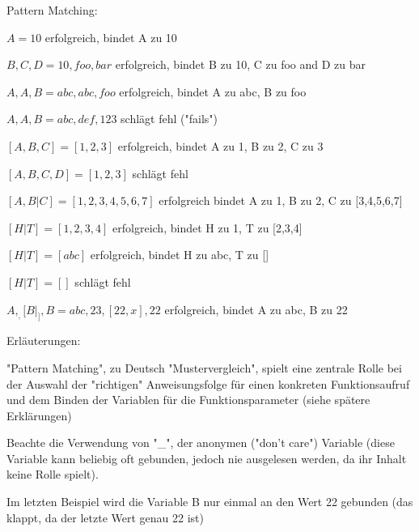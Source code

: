 \documentclass[10pt]{article}
\begin{document}
Pattern Matching:
\begin{itemize*}
  \item $A = 10$ erfolgreich, bindet A zu 10
  \item ${B, C, D} = {10, foo, bar}$ erfolgreich, bindet B zu 10, C zu foo and D zu bar
  \item ${A, A, B} = {abc, abc, foo}$ erfolgreich, bindet A zu abc, B zu foo
  \item ${A, A, B} = {abc, def, 123}$ schlägt fehl ("fails")
  \item $[A,B,C] = [1,2,3]$ erfolgreich, bindet A zu 1, B zu 2, C zu 3
  \item $[A,B,C,D] = [1,2,3]$ schlägt fehl
  \item $[A,B|C] = [1,2,3,4,5,6,7]$ erfolgreich bindet A zu 1, B zu 2, C zu [3,4,5,6,7]
  \item $[H|T] = [1,2,3,4]$ erfolgreich, bindet H zu 1, T zu [2,3,4]
  \item $[H|T] = [abc]$ erfolgreich, bindet H zu abc, T zu []
  \item $[H|T] = []$ schlägt fehl
  \item ${A,_, [B|_],{B}} = {abc,23,[22,x],{22}}$ erfolgreich, bindet A zu abc, B zu 22
  \item Erläuterungen:
  \begin{itemize*}
    \item "Pattern Matching", zu Deutsch "Mustervergleich", spielt eine zentrale Rolle bei der Auswahl der "richtigen" Anweisungsfolge für einen konkreten Funktionsaufruf und dem Binden der Variablen für die Funktionsparameter (siehe spätere Erklärungen)
    \item Beachte die Verwendung von "\_", der anonymen ("don't care") Variable (diese Variable kann beliebig oft gebunden, jedoch nie ausgelesen werden, da ihr Inhalt keine Rolle spielt).
    \item Im letzten Beispiel wird die Variable B nur einmal an den Wert 22 gebunden (das klappt, da der letzte Wert genau {22} ist)
  \end{itemize*}
\end{itemize*}
\end{document}
